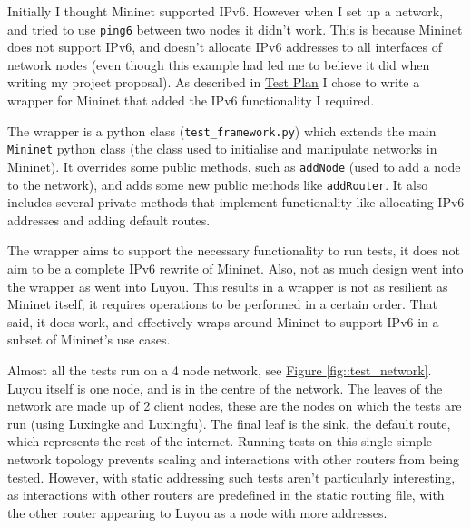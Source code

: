 \documentclass[12pt,a4paper,twoside,openany]{report}
\begin{document}
Initially I thought Mininet\cite{mininet} supported IPv6.  However when I set up a network, and tried to use \verb!ping6! between two nodes it didn't work.  This is because Mininet does not support IPv6, and doesn't allocate IPv6 addresses to all interfaces of network nodes (even though this example\cite{tw_mininet} had led me to believe it did when writing my project proposal).  As described in \hyperref[sec::test_plan]{Test Plan} I chose to write a wrapper for Mininet that added the IPv6 functionality I required.  

\bigskip

The wrapper is a python class (\verb!test_framework.py!) which extends the main \verb!Mininet! python class (the class used to initialise and manipulate networks in Mininet). It overrides some public methods, such as \verb!addNode! (used to add a node to the network), and adds some new public methods like \verb!addRouter!.  It also includes several private methods that implement functionality like allocating IPv6 addresses and adding default routes.  

\bigskip

The wrapper aims to support the necessary functionality to run tests, it does not aim to be a complete IPv6 rewrite of Mininet. Also, not as much design went into the wrapper as went into Luyou. This results in a wrapper is not as resilient as Mininet itself, it requires operations to be performed in a certain order.  That said, it does work, and effectively wraps around Mininet to support IPv6 in a subset of Mininet's use cases.

\bigskip

Almost all the tests run on a 4 node network, see \hyperref[fig::test_network]{Figure }\ref{fig::test_network}.  Luyou itself is one node, and is in the centre of the network.  The leaves of the network are made up of 2 client nodes, these are the nodes on which the tests are run (using Luxingke and Luxingfu).  The final leaf is the sink, the default route, which represents the rest of the internet.  Running tests on this single simple network topology prevents scaling and interactions with other routers from being tested. However, with static addressing such tests aren't particularly interesting, as interactions with other routers are predefined in the static routing file, with the other router appearing to Luyou as a node with more addresses.
\end{document}
